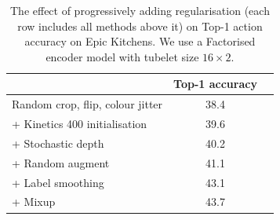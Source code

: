 
\begin{table}[t]
	\centering
	\caption{
		The effect of progressively adding regularisation (each row includes all methods above it) on Top-1 action accuracy on Epic Kitchens.
		We use a Factorised encoder model with tubelet size $16 \times 2$.
	}
	\small{  %
		\begin{tabular}{lcc}
			\toprule 
			& Top-1 accuracy  \\ 
			\midrule
			Random crop, flip, colour jitter           &      38.4   		\\   %
			+ Kinetics 400 initialisation 				 &      39.6  		\\  %
			+ Stochastic depth~\cite{huang_stochasticdepth_eccv_2016}       				 &      40.2 			\\  %
			+ Random augment~\cite{cubuk_arxiv_2019}             				&      41.1 	 \\   %
			+ Label smoothing~\cite{szegedy_cvpr_2016}             				  &      43.1      \\   %
			+ Mixup~\cite{zhang_mixup_iclr_2018}                       	 	  				&      43.7 	   \\   %
			\bottomrule
		\end{tabular}
	}
	\label{tab:regularisation_epic_kitchens}
	\vspace{-\baselineskip}
\end{table}

